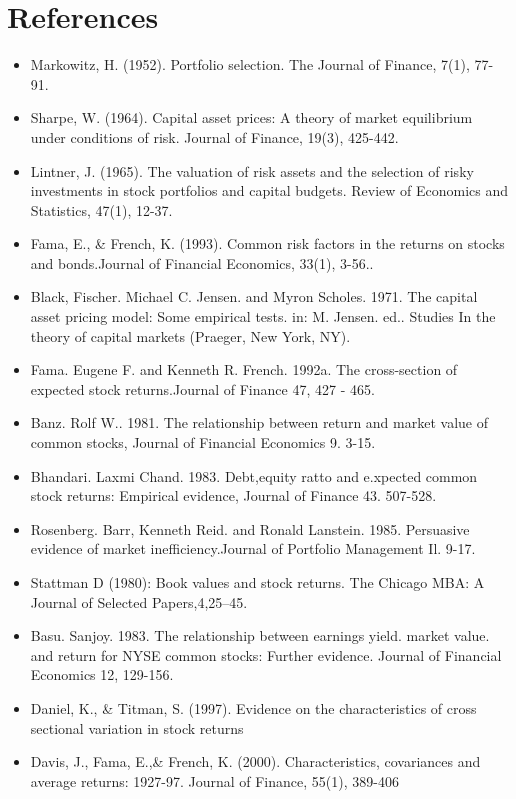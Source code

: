 \documentclass[12pt]{article}
\begin{document}
	\section{References} %
	\begin{itemize}
		\item Markowitz, H. (1952). Portfolio selection. The Journal of Finance, 7(1), 77-91.
		\item Sharpe, W. (1964). Capital asset prices: A theory of market equilibrium under conditions of risk. Journal of Finance, 19(3), 425-442.
		\item Lintner, J. (1965). The valuation of risk assets and the selection of risky investments in stock portfolios and capital budgets. Review of Economics and Statistics, 47(1), 12-37.
		\item Fama, E., \& French, K. (1993). Common risk factors in the returns on stocks and bonds.Journal of Financial Economics, 33(1), 3-56..
		\item Black, Fischer. Michael C. Jensen. and Myron Scholes. 1971. The capital asset pricing model: Some empirical tests. in: M. Jensen. ed.. Studies In the theory of capital markets (Praeger, New York, NY).
		\item Fama. Eugene F. and Kenneth R. French. 1992a. The cross-section of expected stock returns.Journal of Finance 47, 427 - 465.
		\item Banz. Rolf W.. 1981. The relationship between return and market value of common stocks, Journal	of Financial Economics 9. 3-15.
		\item Bhandari. Laxmi Chand. 1983. Debt,equity ratto and e.xpected common stock returns: Empirical evidence, Journal of Finance 43. 507-528.
		\item Rosenberg. Barr, Kenneth Reid. and Ronald Lanstein. 1985. Persuasive evidence of market inefficiency.Journal of Portfolio Management Il. 9-17.
		\item Stattman D (1980): Book values and stock returns. The Chicago MBA: A Journal of Selected Papers,4,25–45. 
		\item Basu. Sanjoy. 1983. The relationship between earnings yield. market value. and return for NYSE common stocks: Further evidence. Journal of Financial Economics 12, 129-156.
		\item Daniel, K., \& Titman, S. (1997). Evidence on the characteristics of cross sectional variation in stock returns
		\item Davis, J., Fama, E.,\& French, K. (2000). Characteristics, covariances and average returns: 1927-97. Journal of Finance, 55(1), 389-406
	\end{itemize}
\end{document}
